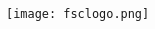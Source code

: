 \documentclass[12pt]{article}
\newcommand{\programnumber}[2]{{
  \vspace{0.2in}
  \textbf{#1}\\
  {\footnotesize #2}
}}
\begin{document}
\begin{multicols*}{2}
\begin{center}
\begin{large}
{\bfseries
}
\end{large}

\vspace{0.7in}

\texttt{[image: fsclogo.png]}

\end{center}

\vfill\null
\columnbreak



\begin{center}



\end{center}
\end{multicols*}
\end{document}
